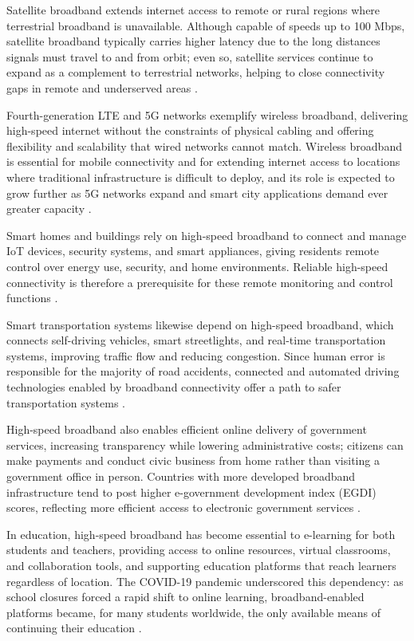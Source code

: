 \documentclass[journal]{IEEEtran}
\begin{document}
Satellite broadband extends internet access to remote or rural regions where terrestrial broadband is unavailable. Although capable of speeds up to 100 Mbps, satellite broadband typically carries higher latency due to the long distances signals must travel to and from orbit; even so, satellite services continue to expand as a complement to terrestrial networks, helping to close connectivity gaps in remote and underserved areas \cite{r20,r21}.

Fourth-generation LTE and 5G networks exemplify wireless broadband, delivering high-speed internet without the constraints of physical cabling and offering flexibility and scalability that wired networks cannot match. Wireless broadband is essential for mobile connectivity and for extending internet access to locations where traditional infrastructure is difficult to deploy, and its role is expected to grow further as 5G networks expand and smart city applications demand ever greater capacity \cite{r22}.

Smart homes and buildings rely on high-speed broadband to connect and manage IoT devices, security systems, and smart appliances, giving residents remote control over energy use, security, and home environments. Reliable high-speed connectivity is therefore a prerequisite for these remote monitoring and control functions \cite{r23}.

Smart transportation systems likewise depend on high-speed broadband, which connects self-driving vehicles, smart streetlights, and real-time transportation systems, improving traffic flow and reducing congestion. Since human error is responsible for the majority of road accidents, connected and automated driving technologies enabled by broadband connectivity offer a path to safer transportation systems \cite{r24}.

High-speed broadband also enables efficient online delivery of government services, increasing transparency while lowering administrative costs; citizens can make payments and conduct civic business from home rather than visiting a government office in person. Countries with more developed broadband infrastructure tend to post higher e-government development index (EGDI) scores, reflecting more efficient access to electronic government services \cite{r25}.

In education, high-speed broadband has become essential to e-learning for both students and teachers, providing access to online resources, virtual classrooms, and collaboration tools, and supporting education platforms that reach learners regardless of location. The COVID-19 pandemic underscored this dependency: as school closures forced a rapid shift to online learning, broadband-enabled platforms became, for many students worldwide, the only available means of continuing their education \cite{r26}.
\end{document}
